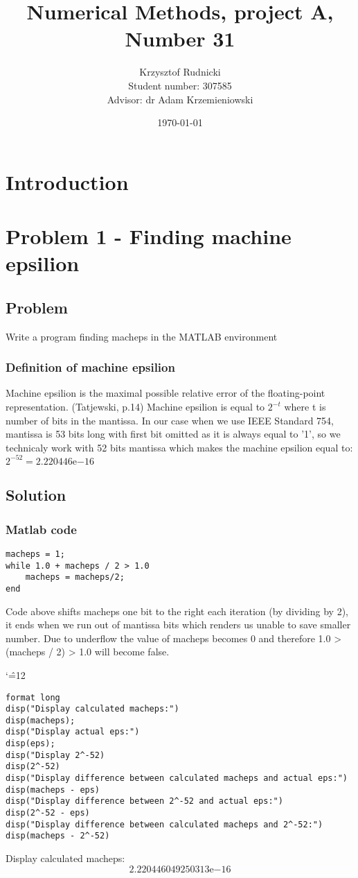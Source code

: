 \documentclass{report}
\title{Numerical Methods, project A, Number 31}
\author{Krzysztof Rudnicki\\ Student number: 307585 \\ Advisor: dr Adam Krzemieniowski}
\date{\today}
\newenvironment{simplechar}{%
   \catcode`\^=12
}{}
\begin{document}
\maketitle
\tableofcontents

\chapter{Introduction}

\chapter{Problem 1 - Finding machine epsilion}

\section{Problem}
Write a program finding macheps in the MATLAB environment
\subsection{Definition of machine epsilion}
Machine epsilion is the maximal possible relative error of the floating-point representation. (Tatjewski, p.14)
Machine epsilion is equal to $2^{-t}$ where t is number of bits in the mantissa.
In our case when we use IEEE Standard 754, mantissa is 53 bits long with first bit omitted as it is always equal to '1', so we technicaly work with 52 bits mantissa which makes the machine epsilion equal to: $2^{-52} = 2.220446\mathrm{e}{-16}$

\section{Solution}

\subsection{Matlab code}
\begin{lstlisting}
macheps = 1;
while 1.0 + macheps / 2 > 1.0
    macheps = macheps/2;
end
\end{lstlisting}
Code above shifts macheps one bit to the right each iteration (by dividing by 2), it ends when we run out of mantissa bits which renders us unable to save smaller number. Due to underflow the value of macheps becomes 0 and therefore 1.0 > (macheps / 2) > 1.0 will become false.

\begin{simplechar}
\begin{lstlisting}
format long
disp("Display calculated macheps:")
disp(macheps);
disp("Display actual eps:")
disp(eps);
disp("Display 2^-52)
disp(2^-52)
disp("Display difference between calculated macheps and actual eps:")
disp(macheps - eps)
disp("Display difference between 2^-52 and actual eps:")
disp(2^-52 - eps)
disp("Display difference between calculated macheps and 2^-52:")
disp(macheps - 2^-52)
\end{lstlisting}
\end{simplechar}
Display calculated macheps:
     \[2.220446049250313\mathrm{e}{-16}\]
\end{document}

